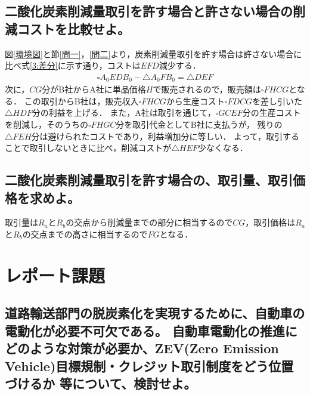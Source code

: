 \documentclass[titlepage,a4paper]{jsarticle}
\begin{document}
\subsection{二酸化炭素削減量取引を許す場合と許さない場合の削減コストを比較せよ。}
図\ref{環境図}と節\ref{問一}，\ref{問二}より，炭素削減量取引を許す場合は許さない場合に比べ式\eqref{3:差分}に示す通り，コストは$EFD$減少する．
\begin{align}
  \square A_0EDB_0 - \triangle A_0FB_0 = \triangle DEF\label{3:差分}
\end{align}
次に，$CG$分がB社からA社に単品価格$H$で販売されるので，販売額は$\square FHCG$となる．
この取引からB社は，販売収入$\square FHCG$から生産コスト$\square FDCG$を差し引いた$\triangle HDF$分の利益を上げる．
また，A社は取引を通じて，$\square GCEF$分の生産コストを削減し，そのうちの$\square FHGC$分を取引代金としてB社に支払うが，
残りの$\triangle FEH$分は避けられたコストであり，利益増加分に等しい．
よって，取引することで取引しないときに比べ，削減コストが$\triangle HEF$少なくなる．
\subsection{二酸化炭素削減量取引を許す場合の、取引量、取引価格を求めよ。}
取引量は$R_a$と$R_b$の交点から削減量までの部分に相当するので$CG$，取引価格は$R_a$と$R_b$の交点までの高さに相当するので$FG$となる．

\section{レポート課題}
\subsection*{道路輸送部門の脱炭素化を実現するために、自動車の電動化が必要不可欠である。
  自動車電動化の推進にどのような対策が必要か、ZEV(Zero Emission Vehicle)目標規制・クレジット取引制度をどう位置づけるか 等について、検討せよ。}
  
\begin{thebibliography}{99}
  \bibitem{}
\end{thebibliography}
\end{document}
